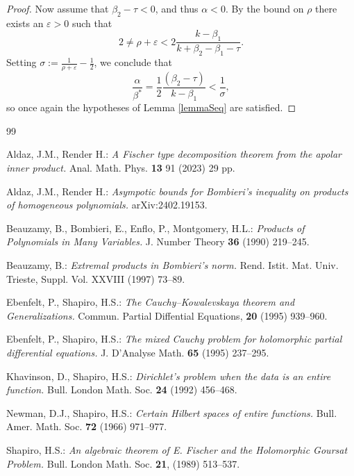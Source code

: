 \documentclass[12pt]{amsart}
\begin{document}
\begin{proof}
	Now assume that $\beta_{2}-\tau<0$, and thus $\alpha < 0$. By the bound on $\rho$  there exists an $\varepsilon > 0$ such that 
	\[
	2 
	\ne
	\rho + \varepsilon
	<
	2\frac{k-\beta_{1}}{k+\beta_{2}-\beta_{1}-\tau}.
	\]
	Setting
	$\sigma:=\frac{1}{\rho+\varepsilon}%
	-\frac{1}{2}$, we conclude that 
	\[
	\frac{\alpha}{\beta^{\ast}}
	=
	\frac{1}{2}\frac{\left(  \beta_{2}-\tau\right)  }{k-\beta_{1}}<\frac{1}%
	{\sigma},
	\]
	so once again the hypotheses of Lemma \ref{lemmaSeq} are satisfied.
\end{proof}


\begin{thebibliography}{99}                                                                                               %
	
	
	Aldaz, J.M., Render H.: \emph{A Fischer type decomposition
		theorem from the apolar inner product.} Anal. Math. Phys. \textbf{13} 91 (2023)
29  pp.
	
	Aldaz, J.M., Render H.: \emph{Asympotic bounds for Bombieri's
		inequality on products of homogeneous polynomials.}  arXiv:2402.19153.
	
	
	Beauzamy, B., Bombieri, E., Enflo, P., Montgomery, H.L.:
	\emph{Products of Polynomials in Many Variables.} J. Number Theory {\bf 36} 	(1990) 219--245.
	

	Beauzamy, B.: \emph{Extremal products in Bombieri's norm.}
	Rend. Istit. Mat. Univ. Trieste, Suppl. Vol. XXVIII (1997) 73--89.
	
	

	 Ebenfelt, P., Shapiro, H.S.: \emph{The Cauchy--Kowalevskaya
		theorem and Generalizations.} Commun. Partial Diffential Equations, {\bf 20} (1995) 939--960.
	
	Ebenfelt, P., Shapiro, H.S.: \emph{The mixed Cauchy problem
		for holomorphic partial differential equations.} J. D'Analyse Math. {\bf  65} (1995) 237--295.
	
	Khavinson, D., Shapiro, H.S.: \emph{Dirichlet's problem when
		the data is an entire function.} Bull. London Math. Soc. \textbf{24}  (1992) 456--468.
	
	Newman, D.J., Shapiro, H.S.: \emph{Certain Hilbert spaces of
		entire functions.} Bull. Amer. Math. Soc. \textbf{ 72}  (1966) 971--977.
	

	Shapiro, H.S.: \emph{An algebraic theorem of E. Fischer and
		the Holomorphic Goursat Problem.} Bull. London Math. Soc. \textbf{21}, (1989) 513--537.
	

\end{thebibliography}
\end{document}
